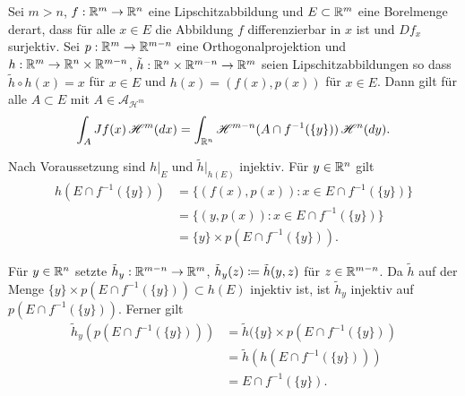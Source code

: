 \documentclass[a4paper,twoside,DIV15,BCOR12mm]{scrbook}
\newcommand{\A}{\mathcal A}
\newcommand{\HM}{\mathscr H}
\begin{document}
\begin{lemma}
\label{lem:3.15}
Sei $m>n$, $f:\mathbb{R}^m\to\mathbb{R}^n$ eine Lipschitzabbildung und $E\subset \mathbb{R}^m$ eine Borelmenge derart, dass für alle $x\in E$ die Abbildung $f$ differenzierbar in $x$ ist und $Df_x$ surjektiv. Sei $p:\mathbb{R}^m\to\mathbb{R}^{m-n}$ eine Orthogonalprojektion und $h:\mathbb{R}^m \to \mathbb{R}^n \times \mathbb{R}^{m-n}$, $\tilde h: \mathbb{R}^n\times\mathbb{R}^{m-n}\to\mathbb{R}^m$ seien Lipschitzabbildungen so dass $\tilde h \circ h(x) = x$ für $x\in E$ und $h(x) = (f(x),p(x))$ für $x\in E$. Dann gilt für alle $A\subset E$ mit $A\in \A_{\HM^m}$
\[
\int_A Jf(x) \,\HM^m(dx) = \int_{\MdR^n} \HM^{m-n}(A \cap f^{-1}(\{y\}))\, \HM^n(dy).
\]
\end{lemma}

\begin{beweis}
Nach Voraussetzung sind $h|_E$ und $\tilde h|_{h(E)}$ injektiv. Für $y\in\mathbb{R}^n$ gilt
\begin{align*}
h(E \cap f^{-1}(\{y\}))
&= \{(f(x),p(x)) : x\in E\cap f^{-1}(\{y\})\} \\
&= \{(y,p(x)) : x \in E\cap f^{-1}(\{y\})\} \\
&= \{y\}\times p(E\cap f^{-1}(\{y\})).
\end{align*}

Für $y\in\mathbb{R}^n$ setzte $\tilde h_y: \mathbb{R}^{m-n}\to\mathbb{R}^m$, $\tilde h_y (z) \da \tilde h (y,z)$ für $z\in\mathbb{R}^{m-n}$. Da $\tilde h$ auf der Menge $\{y\}\times p(E \cap f^{-1}(\{y\})) \subset h(E)$ injektiv ist, ist $\tilde h_y$ injektiv auf $p(E\cap f^{-1}(\{y\}))$. Ferner gilt
\begin{align*}
\tilde h_y(p(E\cap f^{-1}(\{y\})))
&=\tilde h(\{y\}\times p(E\cap f^{-1}(\{y\}))\\
&= \tilde h (h (E\cap f^{-1}(\{y\})))\\
&= E\cap f^{-1}(\{y\}) \tag{$*$}.
\end{align*}


\end{beweis}
\end{document}
